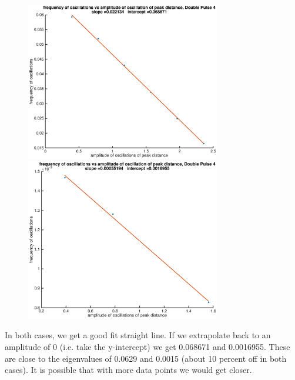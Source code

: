 \documentclass[12pt]{article}
\begin{document}
\begin{figure}[H]
	\includegraphics[width=8.5cm]{ampDP2}
	\includegraphics[width=8.5cm]{ampDP4}
\end{figure}

In both cases, we get a good fit straight line. If we extrapolate back to an amplitude of 0 (i.e. take the y-intercept) we get 0.068671 and 0.0016955. These are close to the eigenvalues of 0.0629 and 0.0015 (about 10 percent off in both cases). It is possible that with more data points we would get closer.
\end{document}

